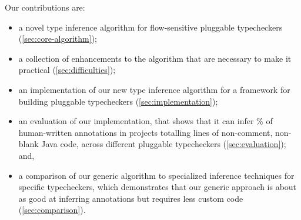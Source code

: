 Our contributions are:
\begin{itemize}
\item a novel type inference algorithm for flow-sensitive pluggable
  typecheckers (\cref{sec:core-algorithm});
\item a collection of enhancements to the algorithm that are necessary to
  make it practical (\cref{sec:difficulties});
\item an implementation of our new type inference algorithm for a framework
  for building pluggable typecheckers (\cref{sec:implementation});
\item an evaluation of our implementation, that shows that it can infer
  \% of human-written annotations in  projects totalling
   lines of non-comment, non-blank Java code, across  different
  pluggable typecheckers (\cref{sec:evaluation}); and,
\item a comparison of our generic algorithm to specialized inference
  techniques for specific typecheckers, which demonstrates that our generic
  approach is about as good at inferring annotations but requires less
  custom code (\cref{sec:comparison}).
\end{itemize}
